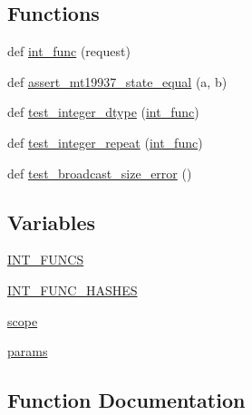 \subsection*{Functions}
\begin{DoxyCompactItemize}
\item 
def \hyperlink{namespacenumpy_1_1random_1_1tests_1_1test__randomstate_a46828a18cf9863b5b13fe9d7f2a2f356}{int\+\_\+func} (request)
\item 
def \hyperlink{namespacenumpy_1_1random_1_1tests_1_1test__randomstate_aece76e7efa6989ced05ac2c15ee1eb38}{assert\+\_\+mt19937\+\_\+state\+\_\+equal} (a, b)
\item 
def \hyperlink{namespacenumpy_1_1random_1_1tests_1_1test__randomstate_a3f1cb4023bd1d058c22bb69bbb7aad24}{test\+\_\+integer\+\_\+dtype} (\hyperlink{namespacenumpy_1_1random_1_1tests_1_1test__randomstate_a46828a18cf9863b5b13fe9d7f2a2f356}{int\+\_\+func})
\item 
def \hyperlink{namespacenumpy_1_1random_1_1tests_1_1test__randomstate_ac14337bcda4f6a8c862c9d93cae53fbe}{test\+\_\+integer\+\_\+repeat} (\hyperlink{namespacenumpy_1_1random_1_1tests_1_1test__randomstate_a46828a18cf9863b5b13fe9d7f2a2f356}{int\+\_\+func})
\item 
def \hyperlink{namespacenumpy_1_1random_1_1tests_1_1test__randomstate_a6803849bd75b008e8b992091a425f05d}{test\+\_\+broadcast\+\_\+size\+\_\+error} ()
\end{DoxyCompactItemize}
\subsection*{Variables}
\begin{DoxyCompactItemize}
\item 
\hyperlink{namespacenumpy_1_1random_1_1tests_1_1test__randomstate_adb1c0f204a5a827a06eb9f7c3e98de4c}{I\+N\+T\+\_\+\+F\+U\+N\+CS}
\item 
\hyperlink{namespacenumpy_1_1random_1_1tests_1_1test__randomstate_afdc045482eaff6c74ac77c49b953d7a2}{I\+N\+T\+\_\+\+F\+U\+N\+C\+\_\+\+H\+A\+S\+H\+ES}
\item 
\hyperlink{namespacenumpy_1_1random_1_1tests_1_1test__randomstate_a0ed9f995d4291b43c11c3efa77c78f99}{scope}
\item 
\hyperlink{namespacenumpy_1_1random_1_1tests_1_1test__randomstate_a7ff01ce642e8a23f87b501c17ca303b8}{params}
\end{DoxyCompactItemize}


\subsection{Function Documentation}
\mbox{\label{namespacenumpy_1_1random_1_1tests_1_1test__randomstate_aece76e7efa6989ced05ac2c15ee1eb38}} 
